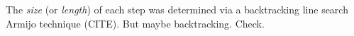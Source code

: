 The \emph{size} (or \emph{length}) of each step was determined via a backtracking line search
Armijo technique (CITE).  But maybe backtracking. Check.





